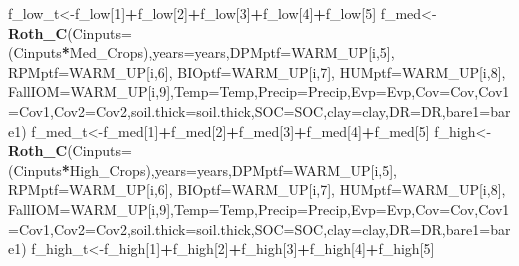 \documentclass[
  10pt,
  b5paper,
]{book}
\newenvironment{Shaded}{\begin{snugshade}}{\end{snugshade}}
\newcommand{\DataTypeTok}[1]{\textcolor[rgb]{0.13,0.29,0.53}{#1}}
\newcommand{\DecValTok}[1]{\textcolor[rgb]{0.00,0.00,0.81}{#1}}
\newcommand{\KeywordTok}[1]{\textcolor[rgb]{0.13,0.29,0.53}{\textbf{#1}}}
\newcommand{\NormalTok}[1]{#1}
\newcommand{\OperatorTok}[1]{\textcolor[rgb]{0.81,0.36,0.00}{\textbf{#1}}}
\begin{document}
\begin{Shaded}
\begin{Highlighting}[]
\NormalTok{f_low_t<-f_low[}\DecValTok{1}\NormalTok{]}\OperatorTok{+}\NormalTok{f_low[}\DecValTok{2}\NormalTok{]}\OperatorTok{+}\NormalTok{f_low[}\DecValTok{3}\NormalTok{]}\OperatorTok{+}\NormalTok{f_low[}\DecValTok{4}\NormalTok{]}\OperatorTok{+}\NormalTok{f_low[}\DecValTok{5}\NormalTok{]}
\NormalTok{f_med<-}\KeywordTok{Roth_C}\NormalTok{(}\DataTypeTok{Cinputs=}\NormalTok{(Cinputs}\OperatorTok{*}\NormalTok{Med_Crops),}\DataTypeTok{years=}\NormalTok{years,}\DataTypeTok{DPMptf=}\NormalTok{WARM_UP[i,}\DecValTok{5}\NormalTok{], }\DataTypeTok{RPMptf=}\NormalTok{WARM_UP[i,}\DecValTok{6}\NormalTok{], }\DataTypeTok{BIOptf=}\NormalTok{WARM_UP[i,}\DecValTok{7}\NormalTok{], }\DataTypeTok{HUMptf=}\NormalTok{WARM_UP[i,}\DecValTok{8}\NormalTok{], }\DataTypeTok{FallIOM=}\NormalTok{WARM_UP[i,}\DecValTok{9}\NormalTok{],}\DataTypeTok{Temp=}\NormalTok{Temp,}\DataTypeTok{Precip=}\NormalTok{Precip,}\DataTypeTok{Evp=}\NormalTok{Evp,}\DataTypeTok{Cov=}\NormalTok{Cov,}\DataTypeTok{Cov1=}\NormalTok{Cov1,}\DataTypeTok{Cov2=}\NormalTok{Cov2,}\DataTypeTok{soil.thick=}\NormalTok{soil.thick,}\DataTypeTok{SOC=}\NormalTok{SOC,}\DataTypeTok{clay=}\NormalTok{clay,}\DataTypeTok{DR=}\NormalTok{DR,}\DataTypeTok{bare1=}\NormalTok{bare1)}
\NormalTok{f_med_t<-f_med[}\DecValTok{1}\NormalTok{]}\OperatorTok{+}\NormalTok{f_med[}\DecValTok{2}\NormalTok{]}\OperatorTok{+}\NormalTok{f_med[}\DecValTok{3}\NormalTok{]}\OperatorTok{+}\NormalTok{f_med[}\DecValTok{4}\NormalTok{]}\OperatorTok{+}\NormalTok{f_med[}\DecValTok{5}\NormalTok{]}
\NormalTok{f_high<-}\KeywordTok{Roth_C}\NormalTok{(}\DataTypeTok{Cinputs=}\NormalTok{(Cinputs}\OperatorTok{*}\NormalTok{High_Crops),}\DataTypeTok{years=}\NormalTok{years,}\DataTypeTok{DPMptf=}\NormalTok{WARM_UP[i,}\DecValTok{5}\NormalTok{], }\DataTypeTok{RPMptf=}\NormalTok{WARM_UP[i,}\DecValTok{6}\NormalTok{], }\DataTypeTok{BIOptf=}\NormalTok{WARM_UP[i,}\DecValTok{7}\NormalTok{], }\DataTypeTok{HUMptf=}\NormalTok{WARM_UP[i,}\DecValTok{8}\NormalTok{], }\DataTypeTok{FallIOM=}\NormalTok{WARM_UP[i,}\DecValTok{9}\NormalTok{],}\DataTypeTok{Temp=}\NormalTok{Temp,}\DataTypeTok{Precip=}\NormalTok{Precip,}\DataTypeTok{Evp=}\NormalTok{Evp,}\DataTypeTok{Cov=}\NormalTok{Cov,}\DataTypeTok{Cov1=}\NormalTok{Cov1,}\DataTypeTok{Cov2=}\NormalTok{Cov2,}\DataTypeTok{soil.thick=}\NormalTok{soil.thick,}\DataTypeTok{SOC=}\NormalTok{SOC,}\DataTypeTok{clay=}\NormalTok{clay,}\DataTypeTok{DR=}\NormalTok{DR,}\DataTypeTok{bare1=}\NormalTok{bare1)}
\NormalTok{f_high_t<-f_high[}\DecValTok{1}\NormalTok{]}\OperatorTok{+}\NormalTok{f_high[}\DecValTok{2}\NormalTok{]}\OperatorTok{+}\NormalTok{f_high[}\DecValTok{3}\NormalTok{]}\OperatorTok{+}\NormalTok{f_high[}\DecValTok{4}\NormalTok{]}\OperatorTok{+}\NormalTok{f_high[}\DecValTok{5}\NormalTok{]}

\end{Highlighting}
\end{Shaded}
\end{document}
